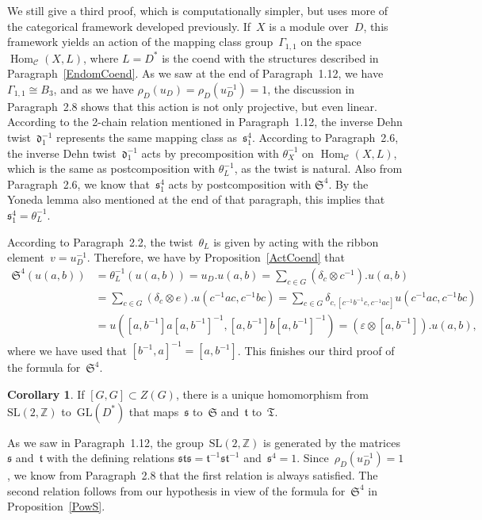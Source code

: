 \documentclass[12pt]{article}
\makeatletter
\theoremstyle{definition}
\newtheorem{Cor}[Satz]{Corollary}
\theoremstyle{break}
\renewenvironment{proof}[1][\proofname]{\par
\vspace{-5pt}%
\pushQED{\qed}%
\normalfont
\topsep0pt \partopsep0pt %
\trivlist
\item[\hskip\labelsep
\bfseries
#1\@addpunct{.}]\ignorespaces
}{%
\popQED\endtrivlist\@endpefalse
\addvspace{6pt plus 6pt} %
}
\newcommand{\Z}{\mathbb{Z}}
\newcommand{\CC}{\mathcal{C}}
\DeclareMathOperator\Hom{Hom}
\newcommand{\GL}{\mathrm{GL}}
\newcommand{\SL}{\mathrm{SL}}
\newcommand{\fS}{\mathfrak{S}}
\newcommand{\fT}{\mathfrak{T}}
\newcommand{\fs}{\mathfrak{s}}
\newcommand{\ft}{\mathfrak{t}}
\newcommand{\fd}{\mathfrak{d}}
\renewcommand{\1}{\mathbbm{1}}
\newcommand{\ot}{\mathbin{\otimes}}
\newcommand{\uu}{u}
\makeatother
\begin{document}
\begin{parlist}
\item
We still give a third proof, which is computationally simpler, but uses more of the categorical framework developed previously. If~$X$ is a module over~$D$, this framework yields an action of the mapping class group~$\Gamma_{1,1}$ on the space $\Hom_\CC(X,L)$, where \mbox{$L=D^*$} is the coend with the structures described in Paragraph~\ref{EndomCoend}. As we saw at the end of Paragraph~1.12, we have~$\Gamma_{1,1} \cong B_3$, and as we have
\mbox{$\rho_D(u_D) = \rho_D(u_D^{-1}) = 1$}, the discussion in Paragraph~2.8 shows that this action is not only projective, but even linear. According to the 2-chain relation mentioned in Paragraph~1.12, the inverse Dehn twist~$\fd_1^{-1}$ represents the same mapping class as~$\fs_1^4$. According to Paragraph~2.6, the inverse Dehn twist~$\fd_1^{-1}$ acts by precomposition with $\theta_{X}^{-1}$ on $\Hom_\CC(X,L)$, which is the same as postcomposition with $\theta_{L}^{-1}$, as the twist is natural. Also from Paragraph~2.6, we know that~$\fs_1^4$
acts by postcomposition with $\fS^{4}$. By the Yoneda lemma also mentioned at the end of that paragraph, this implies that~$\fs_1^4 = \theta_{L}^{-1}$.

According to Paragraph~2.2, the twist~$\theta_L$ is given by acting with the ribbon
element~\mbox{$v = u_D^{-1}$}. Therefore, we have by Proposition~\ref{ActCoend} that
\begin{align*}
\fS^{4}(\uu(a,b)) &= \theta_L^{-1}(\uu(a,b)) = u_D.\uu(a,b)
= \sum_{c \in G}(\delta_{c} \ot c^{-1}).\uu(a,b) \\
&= \sum_{c \in G}(\delta_{c} \ot e).\uu(c^{-1} a c, c^{-1} b c)
= \sum_{c \in G} \delta_{c, [c^{-1} b^{-1} c, c^{-1} a c]} \uu(c^{-1} a c,c^{-1} b c)\\
&= \uu([a, b^{-1}] a [a, b^{-1}]^{-1}, [a, b^{-1}] b [a, b^{-1}]^{-1})
= (\varepsilon \ot [a, b^{-1}]).\uu(a,b),
\end{align*}
where we have used that
$[b^{-1}, a]^{-1} = [a, b^{-1}]$. This finishes our third proof of the formula
for~$\fS^{4}$.
\end{parlist}

\begin{Cor} \label{CorPowS}
If $[G,G] \subset Z(G)$, there is a unique homomorphism from~$\SL(2,\Z)$ to~$\GL(D^*)$ that maps~$\fs$ to~$\fS$ and~$\ft$ to~$\fT$.
\end{Cor}
\begin{proof}
As we saw in Paragraph~1.12, the group~$\SL(2,\Z)$ is generated by the matrices~$\fs$ and~$\ft$ with the defining relations $\fs \ft \fs = \ft^{-1} \fs \ft^{-1}$ and~$\fs^4=1$. Since~\mbox{$\rho_D(u_D^{-1}) = 1$}, we know from Paragraph~2.8 that the first relation is always satisfied. The second relation follows from our hypothesis in view of the formula for~$\fS^4$ in Proposition~\ref{PowS}.
\end{proof}
\end{document}

